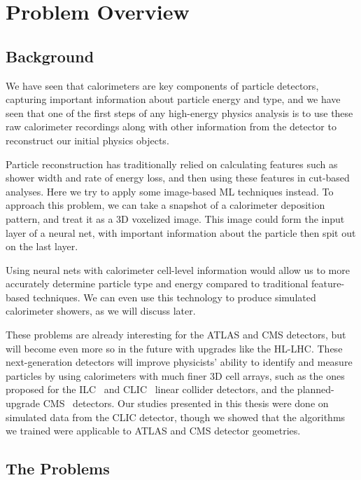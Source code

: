 \chapter{Problem Overview}

\section{Background}

We have seen that calorimeters are key components of particle detectors, capturing important information about particle energy and type, and we have seen that one of the first steps of any high-energy physics analysis is to use these raw calorimeter recordings along with other information from the detector to reconstruct our initial physics objects.

Particle reconstruction has traditionally relied on calculating features such as shower width and rate of energy loss, and then using these features in cut-based analyses. Here we try to apply some image-based ML techniques instead. To approach this problem, we can take a snapshot of a calorimeter deposition pattern, and treat it as a 3D voxelized image. This image could form the input layer of a neural net, with important information about the particle then spit out on the last layer.

Using neural nets with calorimeter cell-level information would allow us to more accurately determine particle type and energy compared to traditional feature-based techniques. We can even use this technology to produce simulated calorimeter showers, as we will discuss later.

These problems are already interesting for the ATLAS and CMS detectors, but will become even more so in the future with upgrades like the HL-LHC. These next-generation detectors will improve physicists' ability to identify and measure particles by using calorimeters with much finer 3D cell arrays, such as the ones proposed for the ILC~\cite{ILC} and CLIC~\cite{CLIC} linear collider detectors, and the planned-upgrade CMS~\cite{CMSCollaboration:2015zni} detectors. Our studies presented in this thesis were done on simulated data from the CLIC detector, though we showed that the algorithms we trained were applicable to ATLAS and CMS detector geometries.

\section{The Problems}
\label{sec:problems}

